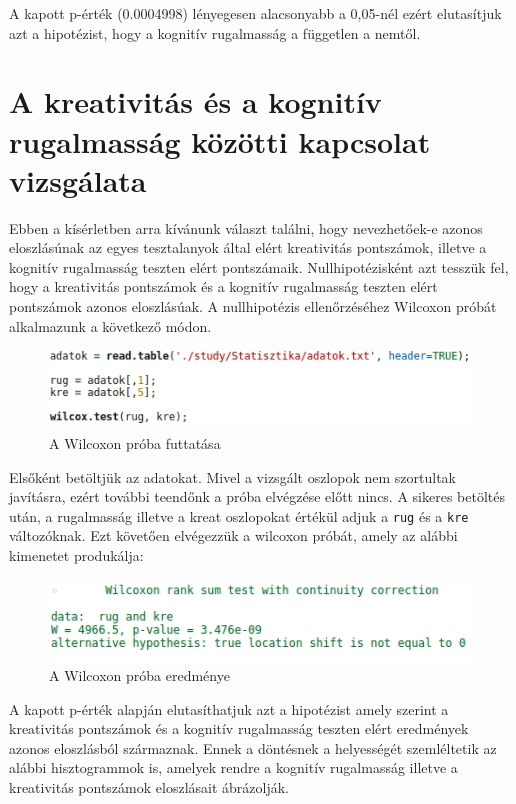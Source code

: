 \documentclass[oneside,titlepage,12pt,a4paper]{report}
\begin{document}
A kapott p-érték (0.0004998) lényegesen alacsonyabb a 0,05-nél ezért elutasítjuk azt a hipotézist, hogy a kognitív rugalmasság a független a nemtől.  


\section*{A kreativitás és a kognitív rugalmasság közötti kapcsolat vizsgálata}

Ebben a kísérletben arra kívánunk választ találni, hogy nevezhetőek-e azonos eloszlásúnak az egyes tesztalanyok által elért kreativitás pontszámok, illetve a kognitív rugalmasság teszten elért pontszámaik. Nullhipotézisként azt tesszük fel, hogy a kreativitás pontszámok és a kognitív rugalmasság teszten elért pontszámok azonos eloszlásúak. A nullhipotézis ellenőrzéséhez Wilcoxon próbát alkalmazunk a következő módon. 


\begin{figure}[H]
\begin{center}
  \includegraphics[width=150mm]{./Abrak/wilcoxCommand.jpg}
  \caption{A Wilcoxon próba futtatása}
\end{center}
\end{figure}

Elsőként betöltjük az adatokat. Mivel a vizsgált oszlopok nem szortultak javításra, ezért további teendőnk a próba elvégzése előtt nincs. A sikeres betöltés után, a rugalmasság illetve a kreat oszlopokat értékül adjuk a \texttt{rug} és a \texttt{kre} változóknak. Ezt követően elvégezzük a wilcoxon próbát, amely az alábbi kimenetet produkálja:

\begin{figure}[H]
\begin{center}
  \includegraphics[width=150mm]{./Abrak/wilcoxOutput.jpg}
  \caption{A Wilcoxon próba eredménye}
\end{center}
\end{figure}

A kapott p-érték alapján elutasíthatjuk azt a hipotézist amely szerint a kreativitás pontszámok és a kognitív rugalmasság teszten elért eredmények azonos eloszlásból származnak. Ennek a döntésnek a helyességét szemléltetik az alábbi hisztogrammok is, amelyek rendre a kognitív rugalmasság illetve a kreativitás pontszámok eloszlásait ábrázolják.


\section*{}
\end{document}

